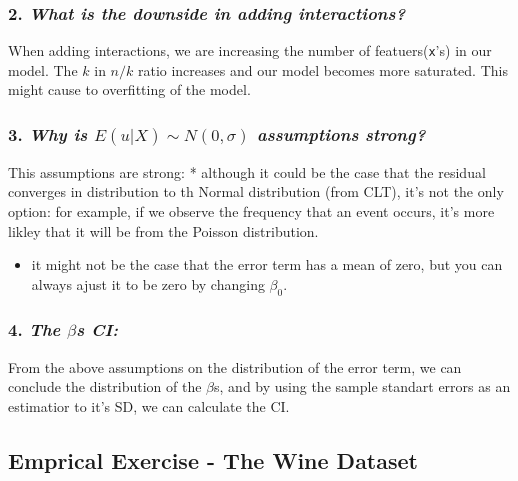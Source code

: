 \documentclass[
]{article}
\providecommand{\tightlist}{%
  \setlength{\itemsep}{0pt}\setlength{\parskip}{0pt}}
\begin{document}
\hypertarget{what-is-the-downside-in-adding-interactions}{%
\subsubsection{\texorpdfstring{2. \emph{What is the downside in adding
interactions?
}}{2. What is the downside in adding interactions? }}\label{what-is-the-downside-in-adding-interactions}}

When adding interactions, we are increasing the number of
featuers(\texttt{x}'s) in our model. The \(k\) in \(n/k\) ratio
increases and our model becomes more saturated. This might cause to
overfitting of the model.

\hypertarget{why-is-eux-sim-n0sigma-assumptions-strong}{%
\subsubsection{\texorpdfstring{3. \emph{Why is
\(E(u|X) \sim N(0,\sigma)\) assumptions
strong?}}{3. Why is E(u\textbar X) \textbackslash sim N(0,\textbackslash sigma) assumptions strong?}}\label{why-is-eux-sim-n0sigma-assumptions-strong}}

This assumptions are strong: * although it could be the case that the
residual converges in distribution to th Normal distribution (from CLT),
it's not the only option: for example, if we observe the frequency that
an event occurs, it's more likley that it will be from the Poisson
distribution.

\begin{itemize}
\tightlist
\item
  it might not be the case that the error term has a mean of zero, but
  you can always ajust it to be zero by changing \(\beta_0\).
\end{itemize}

\hypertarget{the-betas-ci}{%
\subsubsection{\texorpdfstring{4. \emph{The \(\beta\)s
CI:}}{4. The \textbackslash betas CI:}}\label{the-betas-ci}}

From the above assumptions on the distribution of the error term, we can
conclude the distribution of the \(\beta\)s, and by using the sample
standart errors as an estimatior to it's SD, we can calculate the CI.

\hypertarget{emprical-exercise---the-wine-dataset}{%
\subsection{Emprical Exercise - The Wine
Dataset}\label{emprical-exercise---the-wine-dataset}}
\end{document}
